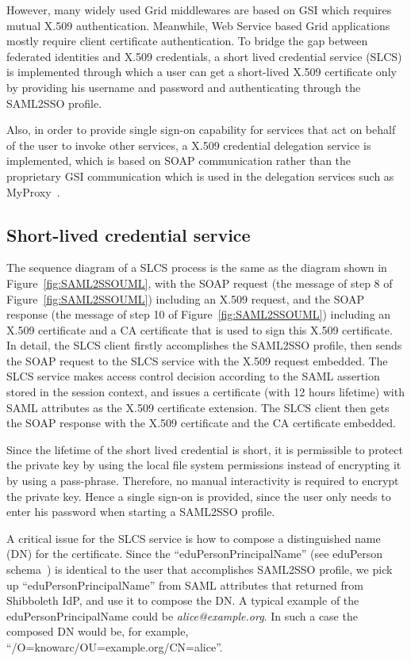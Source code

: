 \documentclass[conference]{IEEEtran}
\begin{document}
However, many widely used Grid middlewares are based on GSI which requires mutual X.509
authentication. Meanwhile, Web Service based Grid applications mostly require client
certificate authentication. To bridge the gap between federated identities and X.509 credentials, a short
lived credential service (SLCS) is implemented through which a user can get a short-lived X.509
certificate only by providing his username and password and authenticating through the SAML2SSO
profile.

Also, in order to provide single sign-on capability for services that act on
behalf of the user to invoke other services, a X.509 credential delegation service is implemented,
which is based on SOAP communication rather than the proprietary GSI communication which is used
in the delegation services such as MyProxy~\cite{myproxy}.

\subsection{Short-lived credential service}
\label{sec:slcs}
The sequence diagram of a SLCS process is the same as the diagram shown in 
Figure~\ref{fig:SAML2SSOUML}, with the SOAP request (the message of step 8 of 
Figure~\ref{fig:SAML2SSOUML}) including an X.509 request, and the SOAP response (the message of step 10 
of Figure~\ref{fig:SAML2SSOUML}) including an X.509 certificate and a CA certificate that is used 
to sign this X.509 certificate. In detail, the SLCS client firstly accomplishes the SAML2SSO profile, 
then sends the SOAP request to the SLCS service with the X.509 request embedded. The SLCS
service makes access control decision according to the SAML assertion stored in the session
context, and issues a certificate (with 12 hours lifetime) with SAML attributes as the X.509
certificate extension. The SLCS client then gets the SOAP response with the X.509
certificate and the CA certificate embedded.

Since the lifetime of the short lived credential is short, it is
permissible to protect the private key by using the local file system permissions instead of encrypting
it by using a pass-phrase. Therefore, no manual interactivity is required to encrypt
the private key. Hence a single sign-on is provided, since the user only needs to enter his
password when starting a SAML2SSO profile.

A critical issue for the SLCS service is how to compose a distinguished name
(DN) for the certificate. Since the ``eduPersonPrincipalName'' (see eduPerson schema~\cite{eduSchemalink})
is identical to the user that accomplishes SAML2SSO profile, we pick up
``eduPersonPrincipalName'' from SAML attributes that returned from Shibboleth IdP, and use it to compose
the DN. A typical example of the eduPersonPrincipalName 
could be \textit{alice@example.org}. In such a case the composed DN would be,
for example,\\``/O=knowarc/OU=example.org/CN=alice''.
\end{document}
